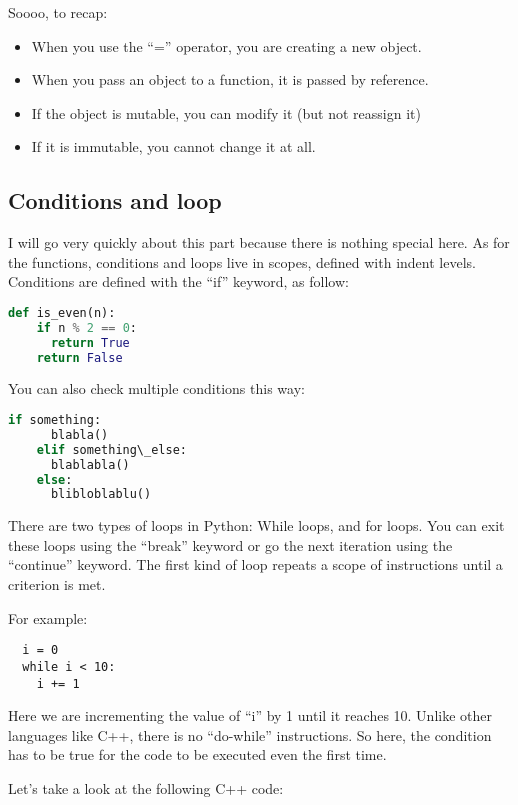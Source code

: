 \vspace{5mm}

Soooo, to recap:

\begin{itemize}
\item When you use the ``='' operator, you are creating a new object.
\item When you pass an object to a function, it is passed by reference.
\item If the object is mutable, you can modify it (but not reassign it)
\item If it is immutable, you cannot change it at all.
\end{itemize}

\subsection{Conditions and loop}
I will go very quickly about this part because there is nothing special here.
As for the functions, conditions and loops live in scopes, defined with indent levels.
Conditions are defined with the ``if'' keyword, as follow:

\begin{lstlisting}[language=python]
  def is_even(n):
    if n % 2 == 0:
      return True
    return False
\end{lstlisting}

You can also check multiple conditions this way:
\begin{lstlisting}[language=python]
    if something:
      blabla()
    elif something\_else:
      blablabla()
    else:
      blibloblablu()
\end{lstlisting}


There are two types of loops in Python: While loops, and for loops. You can exit
these loops using the ``break'' keyword or go the next iteration using the ``continue''
keyword. The first kind of loop repeats a scope of instructions until a criterion is met.

For example:

\begin{lstlisting}
  i = 0
  while i < 10:
    i += 1
\end{lstlisting}

Here we are incrementing the value of ``i'' by 1 until it reaches 10. Unlike other
languages like C++, there is no ``do-while'' instructions. So here, the condition has
to be true for the code to be executed even the first time.

Let's take a look at the following C++ code:

